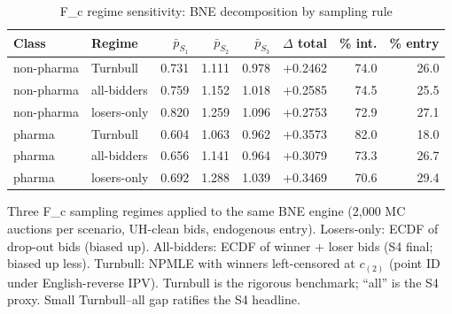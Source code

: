\begin{table}[htbp]
\centering
\begin{threeparttable}
\caption{F\_c regime sensitivity: BNE decomposition by sampling rule}
\label{tab:v3_sensitivity_fc}
\small
\begin{tabular}{llrrrrrr}
\toprule
Class & Regime & $\bar p_{S_1}$ & $\bar p_{S_2}$ & $\bar p_{S_3}$ & $\Delta$ total & \% int. & \% entry \\
\midrule
non-pharma & Turnbull & 0.731 & 1.111 & 0.978 & +0.2462 & 74.0 & 26.0 \\
non-pharma & all-bidders & 0.759 & 1.152 & 1.018 & +0.2585 & 74.5 & 25.5 \\
non-pharma & losers-only & 0.820 & 1.259 & 1.096 & +0.2753 & 72.9 & 27.1 \\
pharma & Turnbull & 0.604 & 1.063 & 0.962 & +0.3573 & 82.0 & 18.0 \\
pharma & all-bidders & 0.656 & 1.141 & 0.964 & +0.3079 & 73.3 & 26.7 \\
pharma & losers-only & 0.692 & 1.288 & 1.039 & +0.3469 & 70.6 & 29.4 \\
\bottomrule
\end{tabular}
\begin{tablenotes}\footnotesize
\item Three F\_c sampling regimes applied to the same BNE engine
(2{,}000 MC auctions per scenario, UH-clean bids, endogenous entry).
Losers-only: ECDF of drop-out bids (biased up). All-bidders:
ECDF of winner + loser bids (S4 final; biased up less). Turnbull:
NPMLE with winners left-censored at $c_{(2)}$ (point ID under
English-reverse IPV). Turnbull is the rigorous benchmark; ``all''
is the S4 proxy. Small Turnbull--all gap ratifies the S4 headline.
\end{tablenotes}
\end{threeparttable}
\end{table}
